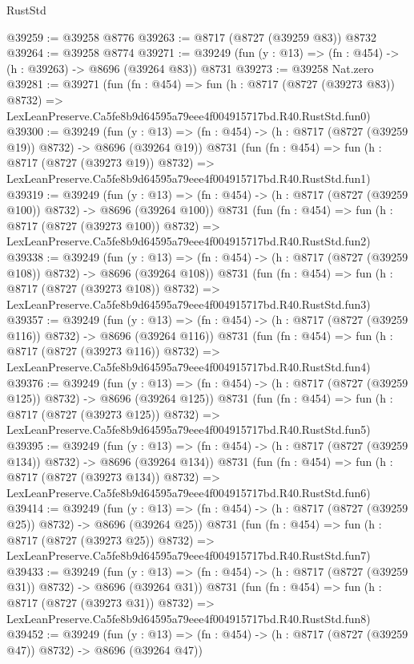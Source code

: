 \begin{lexlean}{RustStd}
\begin{coremodule}
@39259 := @39258 @8776
@39263 := @8717 (@8727 (@39259 @83)) @8732
@39264 := @39258 @8774
@39271 := @39249 (fun (y : @13) => (fn : @454) -> (h : @39263) -> @8696 (@39264 @83)) @8731
@39273 := @39258 Nat.zero
@39281 := @39271
    (fun (fn : @454) =>
    fun (h : @8717 (@8727 (@39273 @83)) @8732) =>
    LexLeanPreserve.Ca5fe8b9d64595a79eee4f004915717bd.R40.RustStd.fun0)
@39300 := @39249
    (fun (y : @13) => (fn : @454) -> (h : @8717 (@8727 (@39259 @19)) @8732) -> @8696 (@39264 @19))
    @8731
    (fun (fn : @454) =>
    fun (h : @8717 (@8727 (@39273 @19)) @8732) =>
    LexLeanPreserve.Ca5fe8b9d64595a79eee4f004915717bd.R40.RustStd.fun1)
@39319 := @39249
    (fun (y : @13) => (fn : @454) -> (h : @8717 (@8727 (@39259 @100)) @8732) -> @8696 (@39264 @100))
    @8731
    (fun (fn : @454) =>
    fun (h : @8717 (@8727 (@39273 @100)) @8732) =>
    LexLeanPreserve.Ca5fe8b9d64595a79eee4f004915717bd.R40.RustStd.fun2)
@39338 := @39249
    (fun (y : @13) => (fn : @454) -> (h : @8717 (@8727 (@39259 @108)) @8732) -> @8696 (@39264 @108))
    @8731
    (fun (fn : @454) =>
    fun (h : @8717 (@8727 (@39273 @108)) @8732) =>
    LexLeanPreserve.Ca5fe8b9d64595a79eee4f004915717bd.R40.RustStd.fun3)
@39357 := @39249
    (fun (y : @13) => (fn : @454) -> (h : @8717 (@8727 (@39259 @116)) @8732) -> @8696 (@39264 @116))
    @8731
    (fun (fn : @454) =>
    fun (h : @8717 (@8727 (@39273 @116)) @8732) =>
    LexLeanPreserve.Ca5fe8b9d64595a79eee4f004915717bd.R40.RustStd.fun4)
@39376 := @39249
    (fun (y : @13) => (fn : @454) -> (h : @8717 (@8727 (@39259 @125)) @8732) -> @8696 (@39264 @125))
    @8731
    (fun (fn : @454) =>
    fun (h : @8717 (@8727 (@39273 @125)) @8732) =>
    LexLeanPreserve.Ca5fe8b9d64595a79eee4f004915717bd.R40.RustStd.fun5)
@39395 := @39249
    (fun (y : @13) => (fn : @454) -> (h : @8717 (@8727 (@39259 @134)) @8732) -> @8696 (@39264 @134))
    @8731
    (fun (fn : @454) =>
    fun (h : @8717 (@8727 (@39273 @134)) @8732) =>
    LexLeanPreserve.Ca5fe8b9d64595a79eee4f004915717bd.R40.RustStd.fun6)
@39414 := @39249
    (fun (y : @13) => (fn : @454) -> (h : @8717 (@8727 (@39259 @25)) @8732) -> @8696 (@39264 @25))
    @8731
    (fun (fn : @454) =>
    fun (h : @8717 (@8727 (@39273 @25)) @8732) =>
    LexLeanPreserve.Ca5fe8b9d64595a79eee4f004915717bd.R40.RustStd.fun7)
@39433 := @39249
    (fun (y : @13) => (fn : @454) -> (h : @8717 (@8727 (@39259 @31)) @8732) -> @8696 (@39264 @31))
    @8731
    (fun (fn : @454) =>
    fun (h : @8717 (@8727 (@39273 @31)) @8732) =>
    LexLeanPreserve.Ca5fe8b9d64595a79eee4f004915717bd.R40.RustStd.fun8)
@39452 := @39249
    (fun (y : @13) => (fn : @454) -> (h : @8717 (@8727 (@39259 @47)) @8732) -> @8696 (@39264 @47))

\end{coremodule}
\end{lexlean}
